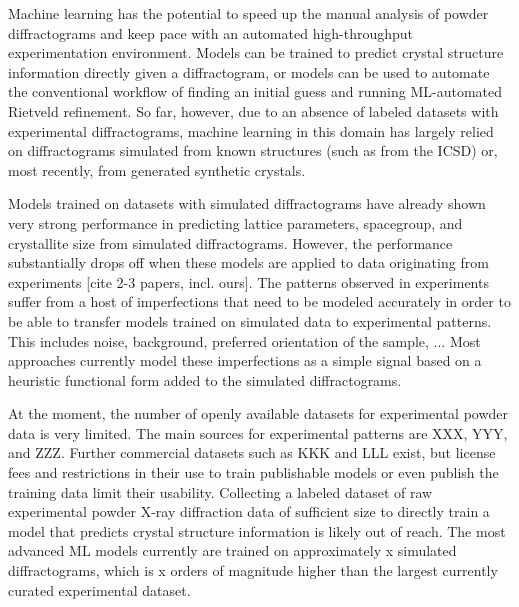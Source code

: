 Machine learning has the potential to speed up the manual analysis of powder diffractograms and keep pace with an automated high-throughput experimentation environment.
Models can be trained to predict crystal structure information directly given a diffractogram, or models can be used to automate the conventional workflow of finding an initial guess and running ML-automated Rietveld refinement.
So far, however, due to an absence of labeled datasets with experimental diffractograms, machine learning in this domain has largely relied on diffractograms simulated from known structures (such as from the ICSD) or, most recently, from generated synthetic crystals.

Models trained on datasets with simulated diffractograms have already shown very strong performance in predicting
lattice parameters, spacegroup, and crystallite size from simulated diffractograms.
However, the performance substantially drops off when these models are applied to data originating from experiments [cite 2-3 papers, incl. ours].
The patterns observed in experiments suffer from a host of imperfections that need to be modeled accurately in order to be able to transfer models trained on simulated data to experimental patterns. This includes noise, background, preferred orientation of the sample, ...
Most approaches currently model these imperfections as a simple signal based on a heuristic functional form added to the simulated diffractograms.

At the moment, the number of openly available datasets for experimental powder data is very limited.
The main sources for experimental patterns are XXX, YYY, and ZZZ.
Further commercial datasets such as KKK and LLL exist, but license fees and restrictions in their use to train publishable models or even publish the training data limit their usability.
Collecting a labeled dataset of raw experimental powder X-ray diffraction data of sufficient size to directly train a model that predicts crystal structure information is likely out of reach.
The most advanced ML models currently are trained on approximately x simulated diffractograms, which is x orders of magnitude higher than the largest currently curated experimental dataset.

